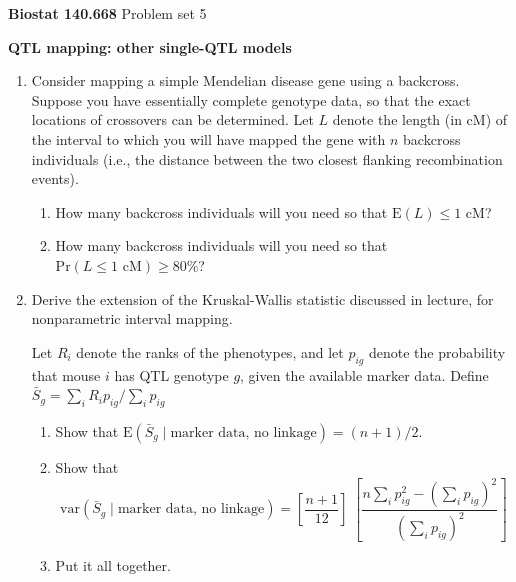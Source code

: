 \documentclass[12pt]{article}
\begin{document}
\noindent \textbf{Biostat 140.668} \hfill Problem set 5

\bigskip 

\noindent \textbf{QTL mapping: other single-QTL models}

\begin{enumerate}

\item Consider mapping a simple Mendelian disease gene using a
backcross.  Suppose you have essentially complete genotype data, so
that the exact locations of crossovers can be determined.  Let $L$
denote the length (in cM) of the interval to which you will have
mapped the gene with $n$ backcross individuals (i.e., the distance
between the two closest flanking recombination events).

\begin{enumerate}
\item How many backcross individuals will you need so that $\text{E}(L) \le 1
\text{ cM}$?

\item How many backcross individuals will you need so that $\text{Pr}(L \le 1
\text{ cM}) \ge 80\%$?
\end{enumerate}

\item Derive the extension of the Kruskal-Wallis statistic
discussed in lecture, for nonparametric interval mapping.  

Let $R_i$
denote the ranks of the phenotypes, and let $p_{ig}$ denote the
probability that mouse $i$ has QTL genotype $g$, given the available
marker data.  Define $\bar{S}_g = \sum_i R_i p_{ig} / \sum_i p_{ig}$

\begin{enumerate}
\item Show that $\text{E}(\bar{S}_g \; | \; \text{marker data, no linkage}) =
(n+1)/2$.

\item Show that 
$$\text{var}(\bar{S}_g \; | \; \text{marker data, no
linkage}) = \left[ \frac{n+1}{12} \right] \; \left[\frac{n \sum_i
p_{ig}^2 - (\sum_i p_{ig})^2}{(\sum_i p_{ig})^2} \right] $$

\item Put it all together.
\end{enumerate}


\end{enumerate}
\end{document}
